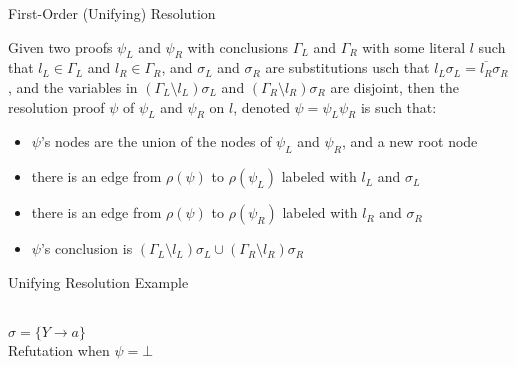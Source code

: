 \begin{frame}{First-Order (Unifying) Resolution}
\begin{definition}
Given two proofs $\psi_L$ and $\psi_R$ with conclusions $\Gamma_L$ and $\Gamma_R$ with some literal $l$ such that $l_L\in \Gamma_L$ and $l_R\in \Gamma_R$, and $\sigma_L$ and $\sigma_R$ are substitutions usch that $l_L\sigma_L=\overline{l_R}\sigma_R$, and the variables in $(\Gamma_L\setminus l_L)\sigma_L$ and $(\Gamma_R\setminus l_R)\sigma_R$ are disjoint, then the resolution proof $\psi$ of $\psi_L$ and $\psi_R$ on $l$, denoted $\psi=\psi_L \psi_R$ is such that:
\begin{itemize}
\item $\psi$'s nodes are the union of the nodes of $\psi_L$ and $\psi_R$, and a new root node
\item there is an edge from $\rho(\psi)$ to $\rho(\psi_L)$ labeled with $l_L$ and $\sigma_L$
\item there is an edge from $\rho(\psi)$ to $\rho(\psi_R)$ labeled with $l_R$ and $\sigma_R$
\item $\psi$'s conclusion is $(\Gamma_L\setminus l_L)\sigma_L\cup (\Gamma_R\setminus l_R)\sigma_R$
\end{itemize}
\end{definition}
\end{frame}

\begin{frame}{Unifying Resolution Example}
\begin{center}
      \\\vspace{1cm}
 $\sigma = \{Y\rightarrow a\}$\\
 Refutation when $\psi=\bot$
 \end{center}
\end{frame}


%
